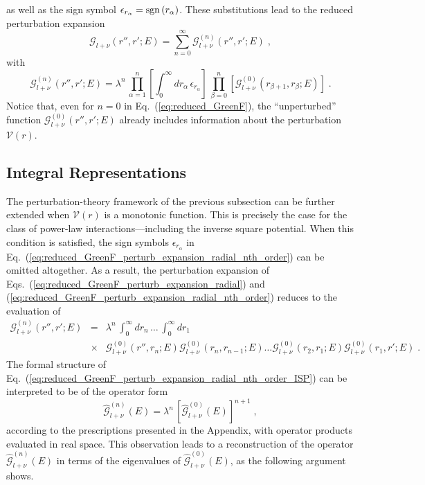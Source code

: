 \documentclass[a4paper,preprint,draft,showpacs,amsmath,amsfonts,amssymb,aps,prd]{revtex4}%
\begin{document}
as well as the sign
symbol
$\epsilon_{r_{\alpha}} = {\rm sgn} \, (r_{\alpha})$.
These substitutions
lead to the reduced perturbation expansion
\begin{equation}
{\mathcal G}_{l+\nu} (r'',r';E) =
\sum_{n=0}^{\infty}
{\mathcal G}^{(n)}_{l+\nu} (r'',r';E) 
\; ,
\label{eq:reduced_GreenF_perturb_expansion_radial}
\end{equation}
with
\begin{equation}
{\mathcal G}^{(n)}_{l+\nu} (r'',r';E) 
=
\lambda^{n}
\,
\prod_{\alpha=1}^{n} 
\left[ 
\int_{0}^{\infty}
d r_{\alpha}  \,  \epsilon_{r_{\alpha}}
\right]
\,
\prod_{\beta=0}^{n} \left[ 
{\mathcal G}^{(0)}_{l+\nu} (r_{\beta +1},r_{\beta};E) 
  \right]
\;  .
\label{eq:reduced_GreenF_perturb_expansion_radial_nth_order}
\end{equation}
Notice that, even for $n=0$ in Eq.~(\ref{eq:reduced_GreenF}),
the ``unperturbed'' function
${\mathcal G}^{(0)}_{l+\nu} (r'',r';E) $ 
already includes information about the perturbation
${\mathcal V} (r)$. 


\subsection{Integral Representations}
\label{sec:integral_representations}


The perturbation-theory framework of the previous subsection can be further extended
when
${\mathcal V} (r)$ is a monotonic function. This is precisely
the case for the class of power-law 
interactions---including the inverse square potential. 
When this condition is satisfied,
the sign symbols
$\epsilon_{r_{\alpha}}$ in
Eq.~(\ref{eq:reduced_GreenF_perturb_expansion_radial_nth_order})
can be omitted altogether.
As a result,
the perturbation expansion of Eqs.~(\ref{eq:reduced_GreenF_perturb_expansion_radial})
and (\ref{eq:reduced_GreenF_perturb_expansion_radial_nth_order})
reduces to the evaluation of
\begin{eqnarray}
{\mathcal G}^{(n)}_{l+\nu} (r'',r';E) 
&
=
&
\lambda^{n}
\,
\int_{0}^{\infty}
  d r_{n} 
\,
\ldots
\,
\int_{0}^{\infty}
 d r_{1}  
\,
\nonumber \\
& \times &
{\mathcal G}^{(0)}_{l+\nu} (r'',r_{n};E) 
{\mathcal G}^{(0)}_{l+\nu} (r_{n},r_{n-1};E) 
\ldots
{\mathcal G}^{(0)}_{l+\nu} (r_{2},r_{1};E) 
{\mathcal G}^{(0)}_{l+\nu} (r_{1},r';E) 
\;  .
\label{eq:reduced_GreenF_perturb_expansion_radial_nth_order_ISP}
\end{eqnarray}
The formal structure
of Eq.~(\ref{eq:reduced_GreenF_perturb_expansion_radial_nth_order_ISP})
can be interpreted to be of the operator form
\begin{equation}
\hat{ {\mathcal G} }^{(n)}_{l+\nu} (E) 
= 
\lambda^{n}
\, 
\left[ 
\hat{\mathcal G}^{(0)}_{l+\nu} (E)
\right]^{n+1}
\; ,
\label{eq:reduced_GreenF_radial_nth_order_ISP_operator}
\end{equation}
according to the prescriptions presented in the Appendix,
with operator products evaluated in real space.
This observation leads to a reconstruction of the operator 
$\hat{ {\mathcal G} }^{(n)}_{l+\nu} (E) $ in terms of the eigenvalues of
$\hat{\mathcal G}^{(0)}_{l+\nu} (E)$, as the following argument shows.
\end{document}
